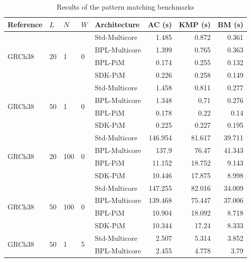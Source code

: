 \begin{table}
    \centering
    \caption{Results of the pattern matching benchmarks}
    \label{tab:pmatch_results}
    \begin{tabular}{lllllrrr}
    \toprule
        Reference & $L$ & $N$ & $W$ & Architecture & AC (s) & KMP (s) & BM (s) \\

\midrule
\multirow{4}{*}{GRCh38} & \multirow{4}{*}{20} & \multirow{4}{*}{1} & \multirow{4}{*}{0} & Std-Multicore & 1.485 & 0.872 & 0.361 \\
&&&& BPL-Multicore & 1.399 & 0.765 & 0.363 \\
\arrayrulecolor{lightgray}\cmidrule{5-8}\arrayrulecolor{black}
&&&& BPL-PiM & 0.174 & 0.255 & 0.132 \\
&&&& SDK-PiM & 0.226 & 0.258 & 0.149 \\
\midrule
\multirow{4}{*}{GRCh38} & \multirow{4}{*}{50} & \multirow{4}{*}{1} & \multirow{4}{*}{0} & Std-Multicore & 1.458 & 0.811 & 0.277 \\
&&&& BPL-Multicore & 1.348 & 0.71 & 0.276 \\
\arrayrulecolor{lightgray}\cmidrule{5-8}\arrayrulecolor{black}
&&&& BPL-PiM & 0.178 & 0.22 & 0.14 \\
&&&& SDK-PiM & 0.225 & 0.227 & 0.195 \\
\midrule
\multirow{4}{*}{GRCh38} & \multirow{4}{*}{20} & \multirow{4}{*}{100} & \multirow{4}{*}{0} & Std-Multicore & 146.954 & 81.617 & 39.711 \\
&&&& BPL-Multicore & 137.9 & 76.47 & 41.343 \\
\arrayrulecolor{lightgray}\cmidrule{5-8}\arrayrulecolor{black}
&&&& BPL-PiM & 11.152 & 18.752 & 9.143 \\
&&&& SDK-PiM & 10.446 & 17.875 & 8.998 \\
\midrule
\multirow{4}{*}{GRCh38} & \multirow{4}{*}{50} & \multirow{4}{*}{100} & \multirow{4}{*}{0} & Std-Multicore & 147.255 & 82.016 & 34.009 \\
&&&& BPL-Multicore & 139.468 & 75.447 & 37.006 \\
\arrayrulecolor{lightgray}\cmidrule{5-8}\arrayrulecolor{black}
&&&& BPL-PiM & 10.904 & 18.092 & 8.718 \\
&&&& SDK-PiM & 10.344 & 17.24 & 8.333 \\
\midrule
\multirow{4}{*}{GRCh38} & \multirow{4}{*}{50} & \multirow{4}{*}{1} & \multirow{4}{*}{5} & Std-Multicore & 2.507 & 5.314 & 3.852 \\
&&&& BPL-Multicore & 2.455 & 4.778 & 3.79 \\

\end{tabular}
\end{table}
